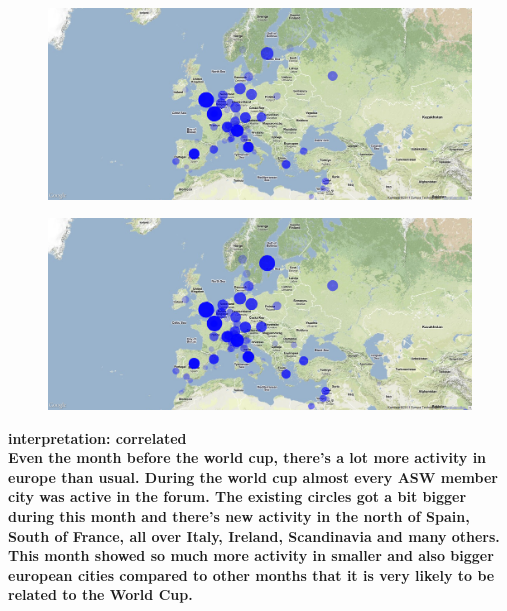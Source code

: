 \documentclass[11pt,a4paper,english]{article}
\begin{document}
\begin{itemize}
\begin{figure}[H]
  							\begin{center}
									\includegraphics[width=130mm]{img/pre-wcfinal}
									\vspace{-13pt}
								\end{center}
						\end{figure}
						\begin{figure}[H]
							\vspace{-13pt}
	  						\begin{center}
									\includegraphics[width=130mm]{img/post-wcfinal}
							\end{center}
							\vspace{-13pt}
						\end{figure}							
						\bf interpretation: \rm correlated
						\\ Even the month before the world cup, there's a lot more activity in europe than usual. During the world cup almost every ASW member city was active in the forum. The existing circles got a bit bigger during this month and there's new activity in the north of Spain, South of France, all over Italy, Ireland, Scandinavia and many others. This month showed so much more activity in smaller and also bigger european cities compared to other months that it is very likely to be related to the World Cup.
						
						
					

\end{itemize}
\end{document}

